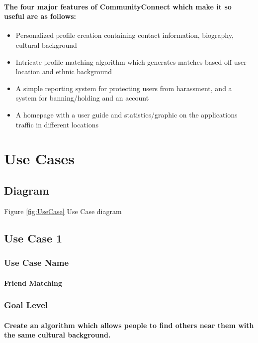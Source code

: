 \documentclass[12pt]{article}
\begin{document}
		\paragraph{\normalfont The four major features of CommunityConnect which make it so useful are as follows:}
		\begin{itemize}
			\item Personalized profile creation containing contact information, biography, cultural background
			\item Intricate profile matching algorithm which generates matches based off user location and ethnic background
			\item A simple reporting system for protecting users from harassment, and a system for banning/holding and an account
			\item A homepage with a user guide and statistics/graphic on the applications traffic in different locations
		\end{itemize}

\section{\bf Use Cases}
  \subsection{\bf Diagram}

		Figure \ref{fig:UseCase} Use Case diagram

	\subsection{\bf Use Case 1}
		\subsubsection{Use Case Name}
			\paragraph{\normalfont Friend Matching
  		}
		\subsubsection{Goal Level}
			\paragraph{\normalfont Create an algorithm which allows people to find others near them with the same cultural background.
	  	}
\end{document}
